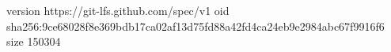 version https://git-lfs.github.com/spec/v1
oid sha256:9ce68028f8e369bdb17ca02af13d75fd88a42fd4ca24eb9e2984abc67f9916f6
size 150304
